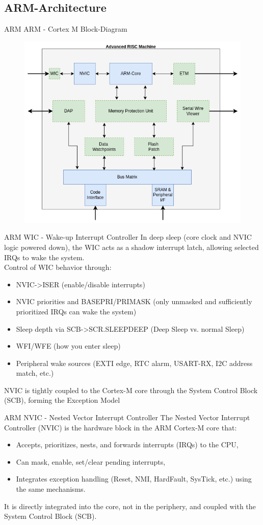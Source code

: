 \documentclass{beamer}
\begin{document}
\subsection{ARM-Architecture}
\begin{frame}{ARM}
	{ARM - Cortex M Block-Diagram}
	\begin{figure}
		\includegraphics[width=.8\linewidth]{ARM_Block_Diagram.png}
	\end{figure}
\end{frame}
\begin{frame}{ARM}
	{WIC - Wake-up Interrupt Controller}
	In deep sleep (core clock and NVIC logic powered down), the WIC acts as a shadow interrupt latch, allowing selected IRQs to wake the system.\\
	\vspace{0.2cm}
	Control of WIC behavior through:
	\begin{itemize}
		\item NVIC->ISER (enable/disable interrupts)
		\item NVIC priorities and BASEPRI/PRIMASK (only unmasked and sufficiently prioritized IRQs can wake the system)
		\item Sleep depth via SCB->SCR.SLEEPDEEP (Deep Sleep vs. normal Sleep)
		\item WFI/WFE (how you enter sleep)
		\item Peripheral wake sources (EXTI edge, RTC alarm, USART-RX, I2C address match, etc.)
	\end{itemize}
	NVIC is tightly coupled to the Cortex-M core through the System Control Block (SCB), forming the Exception Model
\end{frame}
\begin{frame}{ARM}
	{NVIC - Nested Vector Interrupt Controller}
	The Nested Vector Interrupt Controller (NVIC) is the hardware block in the ARM Cortex-M core that:
	\begin{itemize}
		\item Accepts, prioritizes, nests, and forwards interrupts (IRQs) to the CPU,
		\item Can mask, enable, set/clear pending interrupts,
		\item Integrates exception handling (Reset, NMI, HardFault, SysTick, etc.) using the same mechanisms.
	\end{itemize}
	It is directly integrated into the core, not in the periphery, and coupled with the System Control Block (SCB).
\end{frame}
\end{document}
